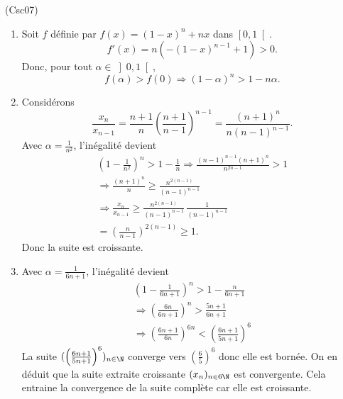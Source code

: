 \begin{tiny}(Csc07)\end{tiny}
\begin{enumerate}
  \item Soit $f$ définie par $f(x) = (1-x)^n + nx$ dans $\left[ 0, 1 \right[$.
\[
  f'(x) = n \left( -(1-x)^{n-1} +1\right) > 0.
\]
Donc, pour tout $\alpha \in \left]0 , 1 \right[$,
\[
  f(\alpha) > f(0)
  \Rightarrow (1- \alpha)^n > 1 - n\alpha.
\]

  \item Considérons 
\[
  \frac{x_{n}}{x_{n-1}} = \frac{n+1}{n} \left( \frac{n+1}{n-1}\right)^{n-1}
   = \frac{(n+1)^{n}}{n(n-1)^{n-1}}.
\]
Avec $\alpha = \frac{1}{n^2}$, l'inégalité devient
\begin{multline*}
  (1-\frac{1}{n^2})^n > 1 - \frac{1}{n} 
  \Rightarrow \frac{(n-1)^{n-1} (n+1)^{n}}{n^{2n-1}} > 1 \\
  \Rightarrow \frac{(n+1)^{n}}{n} \geq \frac{n^{2(n-1)}}{(n-1)^{n-1}}\\
  \Rightarrow \frac{x_{n}}{x_{n-1}} \geq \frac{n^{2(n-1)}}{(n-1)^{n-1}} \, \frac{1}{(n-1)^{n-1}} \\
  = \left(\frac{n}{n-1} \right)^{2(n-1)}\geq 1.
\end{multline*}
Donc la suite est croissante. 

  \item Avec $\alpha = \frac{1}{6n +1}$, l'inégalité devient
\begin{multline*}
  (1- \frac{1}{6n+1})^n > 1 - \frac{n}{6n + 1} \\
  \Rightarrow \left( \frac{6n}{6n + 1}\right)^n > \frac{5n + 1}{6n + 1}\\
  \Rightarrow \left( \frac{6n + 1}{6n}\right)^{6n} < \left( \frac{6n + 1}{5n + 1}\right)^6
\end{multline*}
La suite $(\left( \frac{6n + 1}{5n + 1}\right)^6)_{n\in \N}$ converge vers $(\frac{6}{5})^6$ donc elle est bornée. On en déduit que la suite extraite croissante $(x_n)_{n \in 6\N}$ est convergente. Cela entraine la convergence de la suite complète car elle est croissante. 
\end{enumerate}
